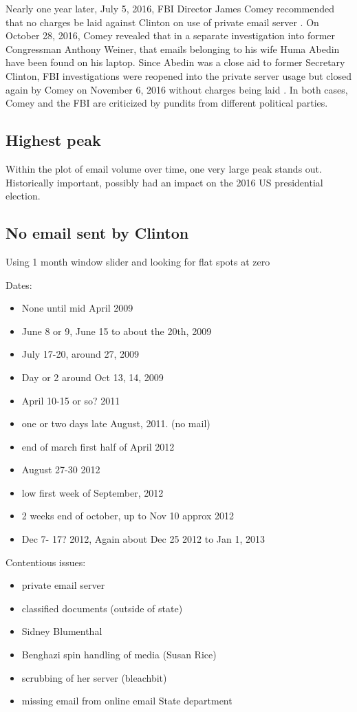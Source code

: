 \documentclass[journal]{vgtc}                %
\begin{document}
Nearly one year later, July 5, 2016,  FBI Director James Comey recommended that no charges be laid against Clinton on use of private email server \cite{nochargeFBI}.  On October 28, 2016, Comey revealed that in a separate investigation into former Congressman Anthony Weiner, that emails belonging to his wife Huma Abedin have been found on his laptop.  Since Abedin was a close aid to former Secretary Clinton, FBI investigations were reopened into the private server usage but closed again by Comey on November 6, 2016 without charges being laid \cite{nochargeFBINov}.  In both cases, Comey and the FBI are criticized by pundits from different political parties.

\subsection{Highest peak}
Within the plot of email volume over time, one very large peak stands out.
Historically important,  possibly had an impact on the 2016 US presidential election.

\subsection{No email sent by Clinton}

Using 1 month window slider and looking for flat spots at zero

Dates:
\begin{itemize}
\item None until mid April 2009
\item June 8 or 9, June 15 to about the 20th, 2009
\item July 17-20,  around 27, 2009 
\item Day or 2 around Oct 13, 14, 2009
\item April 10-15 or so? 2011
\item one or two days late August, 2011. (no mail)
\item end of march first half of April 2012
\item August 27-30  2012 
\item low first week of September, 2012
\item 2 weeks end of october, up to Nov 10 approx 2012
\item Dec 7- 17? 2012,  Again about Dec 25 2012 to Jan 1, 2013
\end{itemize}

Contentious issues:
\begin{itemize}
\item private email server
\item classified documents (outside of state)
\item Sidney Blumenthal
\item Benghazi spin handling of media (Susan Rice)

\item scrubbing of her server (bleachbit)
\item missing email from online email State department
\end{itemize}
\end{document}
